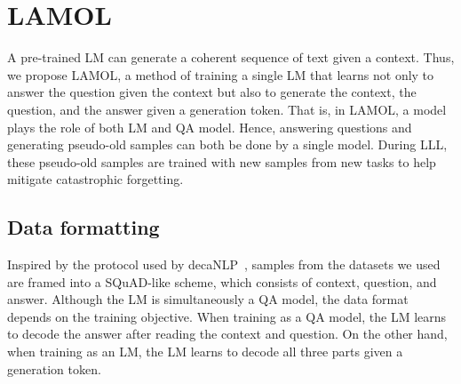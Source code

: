 \documentclass{article} %
\begin{document}
\section{LAMOL}\label{sec:our}
A pre-trained LM can generate a coherent sequence of text given a context.  %
Thus, we propose LAMOL, a method of training a single LM that learns not only to answer the question given the context but also to generate the context, the question, and the answer given a generation token.
That is, in LAMOL, a model plays the role of both LM and QA model.
Hence, answering questions and generating pseudo-old samples can both be done by a single model.
During LLL, these pseudo-old samples are trained with new samples from new tasks to help mitigate catastrophic forgetting.




\subsection{Data formatting} \label{subsec:data_format}
%
%


Inspired by the protocol used by decaNLP~\citep{McCann2018decaNLP}, samples from the datasets we used are framed into a SQuAD-like scheme, which consists of context, question, and answer.
Although the LM is simultaneously a QA model, 
the data format depends on the training objective.  %
When training as a QA model, the LM learns to decode the answer after reading the context and question.
On the other hand, when training as an LM, the LM learns to decode all three parts given a generation token.
\end{document}
